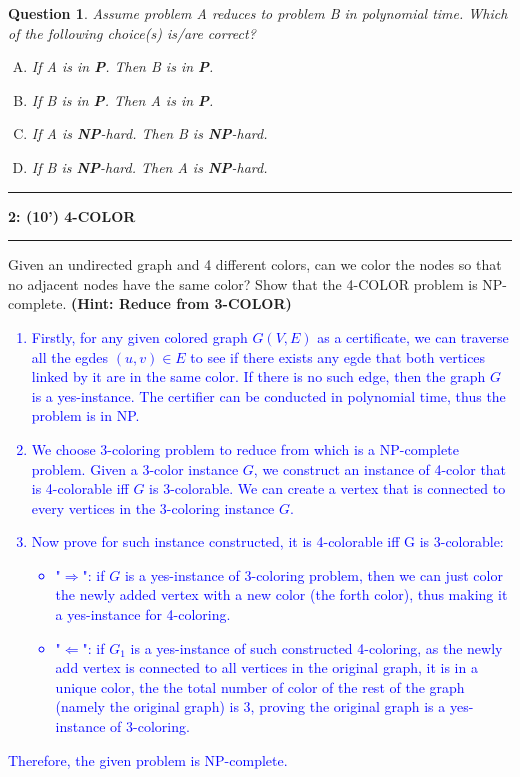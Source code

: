 \documentclass{article}
\newcommand\question[2]{\vspace{.25in}\hrule\textbf{#1: #2}\vspace{.5em}\hrule\vspace{.10in}}
\newtheorem{Q}{Question}
\begin{document}
\begin{Q}
	Assume problem A reduces to problem B in polynomial time. Which of the following choice(s) is/are correct?
	\begin{enumerate}[(A)]
		\item If A is in \textbf{P}. Then B is in \textbf{P}.
		\item If B is in \textbf{P}. Then A is in \textbf{P}.
		\item If A is \textbf{NP}-hard. Then B is \textbf{NP}-hard.
		\item If B is \textbf{NP}-hard. Then A is \textbf{NP}-hard.
	\end{enumerate}
\end{Q}

\pagebreak
\question{2}{(10') 4-COLOR}
Given an undirected graph and 4 different colors, can we color the nodes so that no adjacent nodes have the same color? Show that the 4-COLOR problem is NP-complete. \textbf{(Hint: Reduce from 3-COLOR)}

\textcolor{blue}{
	\begin{enumerate}
		\item Firstly, for any given colored graph $G(V,E)$ as a certificate, we can traverse all the egdes $(u,v)\in E$ to see if there exists any egde that both vertices linked by it are in the same color. If there is no such edge, then the graph $G$ is a yes-instance. The certifier can be conducted in polynomial time, thus the problem is in NP.
		\item We choose 3-coloring problem to reduce from which is a NP-complete problem. Given a 3-color instance $G$, we construct an instance of 4-color that is 4-colorable iff $G$ is 3-colorable. We can create a vertex that is connected to every vertices in the 3-coloring instance $G$.
		\item Now prove for such instance constructed, it is 4-colorable iff G is 3-colorable:
		      \begin{itemize}
			      \item "$\Rightarrow$": if $G$ is a yes-instance of 3-coloring problem, then we can just color the newly added vertex with a new color (the forth color), thus making it a yes-instance for 4-coloring.
			      \item "$\Leftarrow$": if $G_1$ is a yes-instance of such constructed 4-coloring, as the newly add vertex is connected to all vertices in the original graph, it is in a unique color, the the total number of color of the rest of the graph (namely the original graph) is 3, proving the original graph is a yes-instance of 3-coloring.
		      \end{itemize}
	\end{enumerate}
	Therefore, the given problem is NP-complete.
}
\pagebreak
\end{document}
